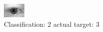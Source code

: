 \begin{figure}[h!]
\begin{center}
\includegraphics[width=0.60\columnwidth]{figures/ID671_class_2_target_3.png}
\end{center}
\caption{ Classification: 2 actual target: 3}
\label{fig:ID671_class_2_target_3}
\end{figure}
